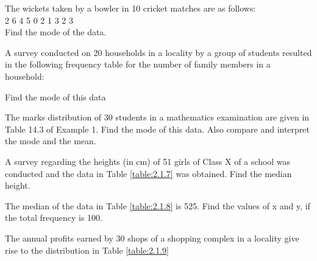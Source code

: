 \item The wickets taken by a bowler in 10 cricket matches are as follows:\\
2 6 4 5 0 2 1 3 2 3\\
Find the mode of the data.
\solution

\item A survey conducted on 20 households in a locality by a group of students
resulted in the following frequency table for the number of family members in a
household:
\begin{table}[!ht]
\centering
{}
\caption{}
\label{table:2.1.5}
\end{table}
Find the mode of this data
\item The marks distribution of 30 students in a mathematics examination are
given in Table 14.3 of Example 1. Find the mode of this data. Also compare and
interpret the mode and the mean.\\
\item A survey regarding the heights (in cm) of 51 girls of Class X of a school
was conducted and the  data in Table \ref{table:2.1.7}
was obtained.  Find the median height.

\begin{table}[!hb]
\centering

\caption{}
\label{table:2.1.7}
\end{table}
\item The median of the  data in Table \ref{table:2.1.8}
is 525. Find the values of x and y, if the
total frequency is 100.
\begin{table}
\centering
{}
\caption{}
\label{table:2.1.8}
\end{table}
\item The annual profits earned by 30 shops of a shopping complex in a locality give rise to  the  distribution in Table \ref{table:2.1.9}

